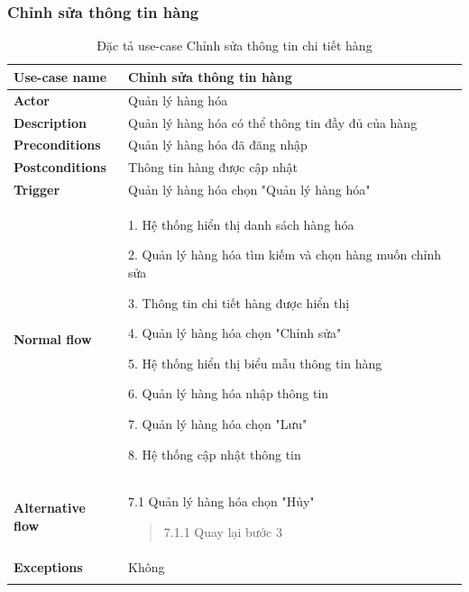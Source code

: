 \subsubsection{Chỉnh sửa thông tin hàng}
{
    \setlength\extrarowheight{6pt}
    \begin{longtable}{| p{} | p{} |}
        \hline
        \textbf{Use-case name}
         &
        Chỉnh sửa thông tin hàng
        \\
        \hline
        \textbf{Actor}
         &
        Quản lý hàng hóa
        \\
        \hline
        \textbf{Description}
         &
        Quản lý hàng hóa có thể thông tin đầy đủ của hàng
        \\
        \hline
        \textbf{Preconditions}
         &
        Quản lý hàng hóa đã đăng nhập
        \\
        \hline
        \textbf{Postconditions}
         &
        Thông tin hàng được cập nhật
        \\
        \hline
        \textbf{Trigger}
         &
        Quản lý hàng hóa chọn "Quản lý hàng hóa"
        \\
        \hline
        \begin{flushleft}
            \textbf{Normal flow}
        \end{flushleft}
         &
        1. Hệ thống hiển thị danh sách hàng hóa

        2. Quản lý hàng hóa tìm kiếm và chọn hàng muốn chỉnh sửa

        3. Thông tin chi tiết hàng được hiển thị

        4. Quản lý hàng hóa chọn "Chỉnh sửa"

        5. Hệ thống hiển thị biểu mẫu thông tin hàng

        6. Quản lý hàng hóa nhập thông tin

        7. Quản lý hàng hóa chọn "Lưu"

        8. Hệ thống cập nhật thông tin
        \\
        \hline
        \begin{flushleft}
            \textbf{Alternative flow}
        \end{flushleft}
         &
        7.1 Quản lý hàng hóa chọn "Hủy"
        \begin{quote}
            7.1.1 Quay lại bước 3
        \end{quote}
        \\
        \hline
        \textbf{Exceptions}
         &
        Không
        \\
        \hline
        \caption{Đặc tả use-case Chỉnh sửa thông tin chi tiết hàng}
    \end{longtable}
}

